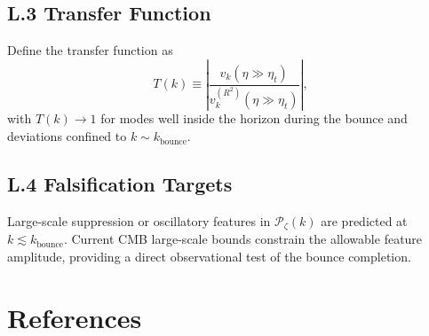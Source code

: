 \subsection{L.3 Transfer Function}
Define the transfer function as
\begin{equation}
    T(k) \equiv \left|\frac{v_k(\eta\gg \eta_t)}{v_k^{(R^2)}(\eta\gg \eta_t)}\right|,
\end{equation}
with $T(k)\to 1$ for modes well inside the horizon during the bounce and deviations confined
to $k\sim k_{\text{bounce}}$.

\subsection{L.4 Falsification Targets}
Large-scale suppression or oscillatory features in $\mathcal{P}_\zeta(k)$ are predicted at
$k\lesssim k_{\text{bounce}}$. Current CMB large-scale bounds constrain the allowable feature
amplitude, providing a direct observational test of the bounce completion.

\section*{References}

